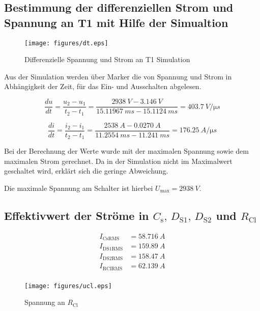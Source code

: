 \subsection{Bestimmung der differenziellen Strom und Spannung an T1 mit Hilfe der Simualtion}

\begin{figure}
\centering
\texttt{[image: figures/dt.eps]}
\caption{Differenzielle Spannung und Strom an T1 Simulation}
\label{fig:dt}
\end{figure}

Aus der Simulation werden über Marker die von Spannung und Strom in Abhängigkeit der Zeit, für das Ein- und Ausschalten abgelesen.

\begin{equation}
    \frac{du}{dt}=\frac{u_2-u_1}{t_2-t_1}=\frac{\qty[]{2938}{V}-\qty[]{3.146}{V}}{\qty[]{15.11967}{ms}-\qty[]{15.1124}{ms}}=\qty[]{403.7}{V/\micro s}
\end{equation}

\begin{equation}
    \frac{di}{dt}=\frac{i_2-i_1}{t_2-t_1}=\frac{\qty[]{2538}{A}-\qty[]{0.0270}{A}}{\qty[]{11.2554}{ms}-\qty[]{11.241}{ms}}=\qty[]{176.25}{A/\micro s}
\end{equation}

Bei der Berechnung der Werte wurde mit der maximalen Spannung sowie dem maximalen Strom gerechnet. Da in der Simulation nicht im Maximalwert geschaltet wird, erklärt sich die geringe Abweichung.

Die maximale Spannung am Schalter ist hierbei $U_\mathrm{max}=\qty[]{2938}{V}$.

\subsection{Effektivwert der Ströme in $C_\mathrm{s},\,D_\mathrm{S1},\,D_\mathrm{S2}$ und $R_\mathrm{Cl}$}

\begin{align}
    I_\mathrm{Cs RMS}&=\qty[]{58.716}{A}\\ 
    I_\mathrm{DS1 RMS}&=\qty[]{159.89}{A}\\
    I_\mathrm{DS2 RMS}&=\qty[]{158.47}{A}\\ 
    I_\mathrm{RCl RMS}&=\qty[]{62.139}{A}\\
\end{align}

\begin{figure}[h]
\centering
\texttt{[image: figures/ucl.eps]}
\caption{Spannung an $R_\mathrm{Cl}$}
\label{fig:ucl}
\end{figure}